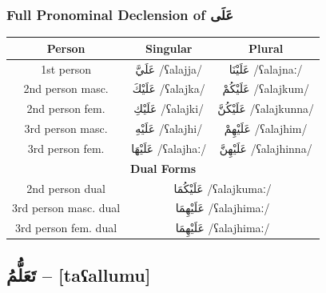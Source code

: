 \documentclass[letterpaper,12pt]{article}
\begin{document}
\subsubsection*{Full Pronominal Declension of \textarabic{عَلَى}}

\begin{tabular}{|c|c|c|}
\hline
\textbf{Person} & \textbf{Singular} & \textbf{Plural} \\
\hline
1st person & \textarabic{عَلَيَّ} /ʕalajja/ & \textarabic{عَلَيْنَا} /ʕalajnaː/ \\
\hline
2nd person masc. & \textarabic{عَلَيْكَ} /ʕalajka/ & \textarabic{عَلَيْكُمْ} /ʕalajkum/ \\
\hline
2nd person fem. & \textarabic{عَلَيْكِ} /ʕalajki/ & \textarabic{عَلَيْكُنَّ} /ʕalajkunna/ \\
\hline
3rd person masc. & \textarabic{عَلَيْهِ} /ʕalajhi/ & \textarabic{عَلَيْهِمْ} /ʕalajhim/ \\
\hline
3rd person fem. & \textarabic{عَلَيْهَا} /ʕalajhaː/ & \textarabic{عَلَيْهِنَّ} /ʕalajhinna/ \\
\hline
\multicolumn{3}{|c|}{\textbf{Dual Forms}} \\
\hline
2nd person dual & \multicolumn{2}{c|}{\textarabic{عَلَيْكُمَا} /ʕalajkumaː/} \\
\hline
3rd person masc. dual & \multicolumn{2}{c|}{\textarabic{عَلَيْهِمَا} /ʕalajhimaː/} \\
\hline
3rd person fem. dual & \multicolumn{2}{c|}{\textarabic{عَلَيْهِمَا} /ʕalajhimaː/} \\
\hline
\end{tabular}

\subsection{\textarabic{تَعَلُّمُ} – [taʕallumu]}
\end{document}

